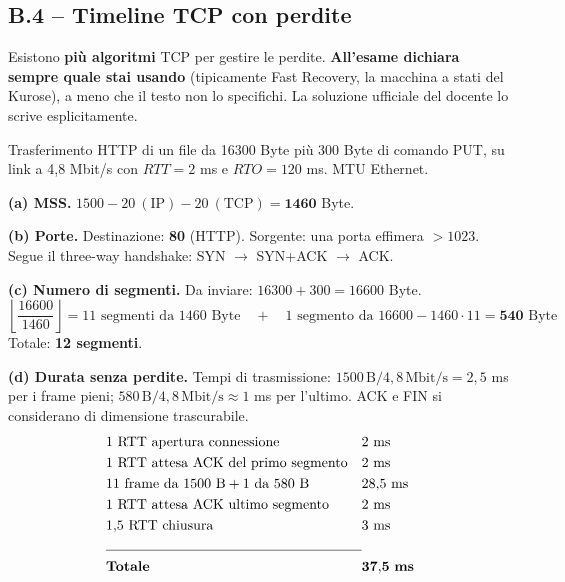 \documentclass[12pt, a4paper]{article}
\begin{document}
\subsection*{B.4 -- Timeline TCP con perdite}

\begin{tcolorbox}[colback=red!5, colframe=red!60!black, title=\textbf{Regola d'oro per questo esercizio}]
Esistono \textbf{più algoritmi} TCP per gestire le perdite. \textbf{All'esame dichiara sempre quale stai usando} (tipicamente Fast Recovery, la macchina a stati del Kurose), a meno che il testo non lo specifichi. La soluzione ufficiale del docente lo scrive esplicitamente.
\end{tcolorbox}

\begin{tcolorbox}[colback=orange!5, colframe=orange!70!black, title=\textbf{Esercizio B.4 (esame 16 giugno 2015, soluzione ufficiale)}]
Trasferimento HTTP di un file da 16300 Byte più 300 Byte di comando PUT, su link a 4,8 Mbit/s con $RTT = 2$ ms e $RTO = 120$ ms. MTU Ethernet.

\textbf{(a) MSS.} $1500 - 20\ (\text{IP}) - 20\ (\text{TCP}) = \mathbf{1460}$ Byte.

\textbf{(b) Porte.} Destinazione: \textbf{80} (HTTP). Sorgente: una porta effimera $>1023$. Segue il three-way handshake: SYN $\to$ SYN+ACK $\to$ ACK.

\textbf{(c) Numero di segmenti.} Da inviare: $16300 + 300 = 16600$ Byte.
$$\left\lfloor \frac{16600}{1460} \right\rfloor = 11 \text{ segmenti da 1460 Byte} \quad + \quad 1 \text{ segmento da } 16600 - 1460\cdot 11 = \mathbf{540} \text{ Byte}$$
Totale: \textbf{12 segmenti}.

\textbf{(d) Durata senza perdite.} Tempi di trasmissione: $1500\,\text{B}/4{,}8\,\text{Mbit/s} = 2{,}5$ ms per i frame pieni; $580\,\text{B}/4{,}8\,\text{Mbit/s} \approx 1$ ms per l'ultimo. ACK e FIN si considerano di dimensione trascurabile.
\begin{align*}
&\text{1 RTT apertura connessione} && 2\ \text{ms}\\
&\text{1 RTT attesa ACK del primo segmento} && 2\ \text{ms}\\
&\text{11 frame da 1500 B} + \text{1 da 580 B} && 28{,}5\ \text{ms}\\
&\text{1 RTT attesa ACK ultimo segmento} && 2\ \text{ms}\\
&\text{1,5 RTT chiusura} && 3\ \text{ms}\\
\cline{1-3}
&\textbf{Totale} && \mathbf{37{,}5\ ms}
\end{align*}


\end{tcolorbox}
\end{document}
